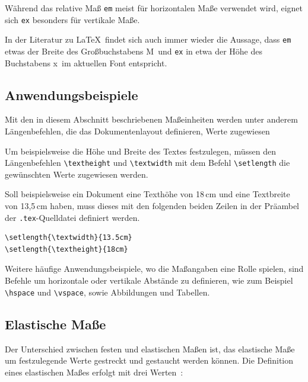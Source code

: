 Während das relative Maß \verb!em! meist für horizontalen Maße verwendet wird, eignet sich \verb!ex! besonders für vertikale Maße. 

In der Literatur zu \LaTeX\ findet sich auch immer wieder die Aussage, dass \verb!em! etwas der 
Breite des Großbuchstabens \glqq M\grqq\ und \verb!ex! in etwa der Höhe des Buchstabens \glqq x\grqq\ im aktuellen Font entspricht.~\cite{Kopka2000,Schwarz1988}




\subsection{Anwendungsbeispiele}

Mit den in diesem Abschnitt beschriebenen Maßeinheiten werden unter anderem 
Längenbefehlen, die das Dokumentenlayout definieren, Werte zugewiesen

Um beispielsweise die Höhe und Breite des Textes festzulegen, müssen den Längenbefehlen \verb!\textheight! und \verb!\textwidth! mit dem Befehl \verb!\setlength! die gewünschten Werte zugewiesen werden.




Soll beispielsweise ein Dokument eine Texthöhe von 18\,cm und eine
Textbreite von 13,5\,cm haben, muss dieses mit den folgenden beiden Zeilen in der Präambel der \verb!.tex!-Quelldatei definiert werden.


\begin{Verbatim}[frame=single]
\setlength{\textwidth}{13.5cm}
\setlength{\textheight}{18cm}
\end{Verbatim}

Weitere häufige Anwendungsbeispiele, wo die Maßangaben eine Rolle spielen, sind Befehle um horizontale oder vertikale Abstände zu definieren, wie zum Beispiel \verb!\hspace! und \verb!\vspace!, sowie Abbildungen und Tabellen.

\subsection{Elastische Maße}
\label{Elastische_Masse}

Der Unterschied zwischen festen und elastischen 
Maßen ist, das elastische Maße um festzulegende Werte gestreckt und gestaucht werden
können. Die Definition eines elastischen Maßes erfolgt mit drei Werten~\cite{Kopka2000}: 


